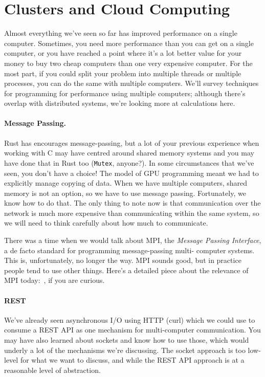 




\section*{Clusters and Cloud Computing}
Almost everything we've seen so far has improved performance on a single
computer. Sometimes, you need more performance than you can get on a
single computer, or you have reached a point where it's a lot better value for
your money to buy two cheap computers than one very expensive computer.
For the most part, if you could split your problem into
multiple threads or multiple processes, you can do the same with multiple
computers. We'll survey techniques for programming for
performance using multiple computers; although there's overlap with
distributed systems, we're looking more at calculations here.

\paragraph*{Message Passing.} Rust has encourages message-passing, but
a lot of your previous experience when working with C may have centred around
shared memory systems and you may have done that in Rust too (\texttt{Mutex}, 
anyone?). In some circumstances that we've seen, you don't have a choice!
The model of GPU programming meant we had to explicitly
manage copying of data. When we have multiple computers, shared memory is not
an option, so we have to use message passing. Fortunately, we know how to do
that. The only thing to note now is that communication over the network is
much more expensive than communicating within the same system, so we will
need to think carefully about how much to communicate.

There was a time when we would talk about MPI, the \emph{Message Passing 
Interface}, a de facto standard for programming message-passing multi-
computer systems. This is, unfortunately, no longer the way. 
MPI sounds good, but in practice people tend to use other things. 
Here's a detailed piece about the relevance of MPI today:~\cite{hpcmpi}, if 
you are curious. 

\paragraph{REST}
We've already seen asynchronous I/O using HTTP (curl) which we could use to
consume a REST API as one mechanism for multi-computer communication. You
may have also learned about sockets and know how to use those, which would
underly a lot of the mechanisms we're discussing. The socket approach is too
low-level for what we want to discuss, and while the REST API approach is at a
reasonable level of abstraction. 

